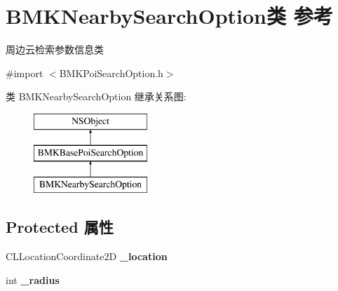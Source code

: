 \hypertarget{interface_b_m_k_nearby_search_option}{\section{B\+M\+K\+Nearby\+Search\+Option类 参考}
\label{interface_b_m_k_nearby_search_option}
}


周边云检索参数信息类  




{\ttfamily \#import $<$B\+M\+K\+Poi\+Search\+Option.\+h$>$}

类 B\+M\+K\+Nearby\+Search\+Option 继承关系图\+:\begin{figure}[H]
\begin{center}
\leavevmode
\includegraphics[height=3.000000cm]{interface_b_m_k_nearby_search_option}
\end{center}
\end{figure}
\subsection*{Protected 属性}
\begin{DoxyCompactItemize}
\item 
\hypertarget{interface_b_m_k_nearby_search_option_aa9be54322f66430b9f11d1259224b037}{C\+L\+Location\+Coordinate2\+D {\bfseries \+\_\+location}}\label{interface_b_m_k_nearby_search_option_aa9be54322f66430b9f11d1259224b037}

\item 
\hypertarget{interface_b_m_k_nearby_search_option_a90c1dbf1f976af8e3b80e7fe86e1ca98}{int {\bfseries \+\_\+radius}}\label{interface_b_m_k_nearby_search_option_a90c1dbf1f976af8e3b80e7fe86e1ca98}

\end{DoxyCompactItemize}
